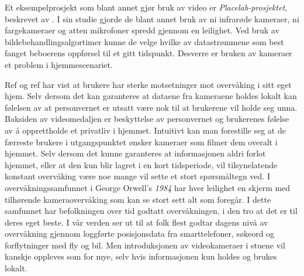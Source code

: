 {Et eksempelprosjekt som blant annet gjør bruk av video er \emph{Placelab-prosjektet}, beskrevet av \citet{placelab05}. I sin studie gjorde de blant annet bruk av ni infrarøde kameraer, ni fargekameraer og atten mikrofoner spredd gjennom en leilighet. Ved bruk av bildebehandlingsalgortimer kunne de velge hvilke av datastrømmene som best fanget beboerens oppførsel til et gitt tidspunkt.
Desverre er bruken av kameraer et problem i hjemmescenariet.

{\color{red} Ref og ref} har vist at brukere har sterke motsetninger mot overvåking i sitt eget hjem. Selv dersom det kan garanteres at dataene fra kameraene holdes lokalt kan følelsen av at personvernet er utsatt være nok til at brukerene vil holde seg unna. Baksiden av videomedaljen er beskyttelse av personvernet og brukerenes følelse av å opprettholde et privatliv i hjemmet. Intuitivt kan man forestille seg at de færreste brukere i utgangspunktet ønsker kameraer som filmer dem overalt i hjemmet. Selv dersom det kunne garanteres at informasjonen aldri forlot hjemmet, eller at den kun blir lagret i en kort tidsperiode, vil tilsynelatende konstant overvåking være noe mange vil sette et stort spørsmåltegn ved. I overvåkningssamfunnet i George Orwell's \emph{1984} har hver leilighet en skjerm med tilhørende kameraovervåking som kan se stort sett alt som foregår. I dette samfunnet har befolkningen over tid godtatt overvåkningen, i den tro at det er til deres eget beste. I vår verden ser ut til at folk flest godtar dagens nivå av overvåkning gjennom loggførte posisjonsdata fra smarttelefoner, søkeord og forflytninger med fly og bil. Men introduksjonen av videokameraer i stuene vil kanskje oppleves som for mye, selv hvis informasjonen kun holdes og brukes lokalt.
}


